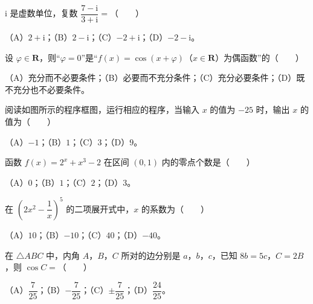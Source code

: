 

\begin{question}
$\mathrm i$ 是虚数单位，复数 $\dfrac{7-\mathrm i}{3+\mathrm i}=$\mbox{（　　）}

（A）$2+\mathrm i$；（B）$2-\mathrm i$；（C）$-2+\mathrm i$；（D）$-2-\mathrm i$。

\end{question}
\begin{question}
设 $\varphi\in\mathbf R$，则“$\varphi=0$”是“$f(x)=\cos(x+\varphi)$（$x\in\mathbf R$）为偶函数”的\mbox{（　　）}

（A）充分而不必要条件；（B）必要而不充分条件；（C）充分必要条件；（D）既不充分也不必要条件。

\Needspace{0.4\textheight}
\end{question}
\begin{question}
阅读如图所示的程序框图，运行相应的程序，当输入 $x$ 的值为 $-25$ 时，输出 $x$ 的值为\mbox{（　　）}
\nopagebreak[4]
\begin{center}\end{center}
\nopagebreak[4]
（A）$-1$；（B）$1$；（C）$3$；（D）$9$。

\end{question}
\begin{question}
函数 $f(x)=2^x+x^3-2$ 在区间 $(0,1)$ 内的零点个数是\mbox{（　　）}

（A）$0$；（B）$1$；（C）$2$；（D）$3$。

\end{question}
\begin{question}
在 $\left(2x^2-\dfrac1x\right)^5$ 的二项展开式中，$x$ 的系数为\mbox{（　　）}

（A）$10$；（B）$-10$；（C）$40$；（D）$-40$。

\end{question}
\begin{question}
在 $\triangle ABC$ 中，内角 $A$，$B$，$C$ 所对的边分别是 $a$，$b$，$c$，已知 $8b=5c$，$C=2B$，则 $\cos C=$\mbox{（　　）}

（A）$\dfrac7{25}$；（B）$-\dfrac7{25}$；（C）$\pm\dfrac7{25}$；（D）$\dfrac{24}{25}$。

\end{question}
